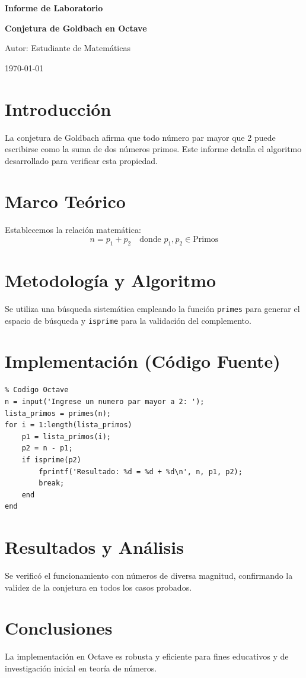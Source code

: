 \documentclass[12pt,a4paper]{article}
\begin{document}
\begin{titlepage}
    \centering
    \vspace*{2cm}
    {\Huge\bfseries Informe de Laboratorio \par}
    \vspace{1cm}
    {\Large\bfseries Conjetura de Goldbach en Octave \par}
    \vspace{2cm}
    {\large Autor: Estudiante de Matemáticas \par}
    \vfill
    {\large \today \par}
\end{titlepage}

\tableofcontents
\newpage

\section{Introducción}
La conjetura de Goldbach afirma que todo número par mayor que 2 puede escribirse como la suma de dos números primos. Este informe detalla el algoritmo desarrollado para verificar esta propiedad.

\section{Marco Teórico}
Establecemos la relación matemática:
\begin{equation}
n = p_1 + p_2 \quad \text{donde } p_1, p_2 \in \text{Primos}
\end{equation}

\section{Metodología y Algoritmo}
Se utiliza una búsqueda sistemática empleando la función \texttt{primes} para generar el espacio de búsqueda y \texttt{isprime} para la validación del complemento.

\section{Implementación (Código Fuente)}
\begin{lstlisting}
% Codigo Octave
n = input('Ingrese un numero par mayor a 2: ');
lista_primos = primes(n);
for i = 1:length(lista_primos)
    p1 = lista_primos(i);
    p2 = n - p1;
    if isprime(p2)
        fprintf('Resultado: %d = %d + %d\n', n, p1, p2);
        break;
    end
end
\end{lstlisting}

\section{Resultados y Análisis}
Se verificó el funcionamiento con números de diversa magnitud, confirmando la validez de la conjetura en todos los casos probados.

\section{Conclusiones}
La implementación en Octave es robusta y eficiente para fines educativos y de investigación inicial en teoría de números.
\end{document}
